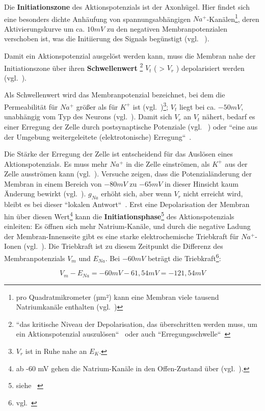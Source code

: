 {Die \textbf{Initiationszone} des Aktionspotenzials ist der Axonhügel. Hier findet sich eine besonders dichte Anhäufung von spannungsabhängigen $Na^+$-Kanälen\footnote{
 pro Quadratmikrometer (µm²) kann eine Membran viele tausend Natriumkanäle enthalten (vgl.~\cite[99]{BCP18})
}, deren Aktivierungskurve um ca. $10 mV$ zu den negativen Membranpotenzialen verschoben ist, was die Initiierung des Signals begünstigt (vgl. ~\cite[77]{Jon19}).

Damit ein Aktionspotenzial ausgelöst werden kann, muss die Membran nahe der Initiationszone über ihren \textbf{Schwellenwert} \footnote{
 ``das kritische Niveau der Depolarisation, das überschritten werden muss, um ein Aktionspotenzial auszulösen``~\cite[88]{BCP18} oder auch ``Erregungsschwelle``~\cite[69]{FE19}
} $V_t$ ( > $V_r$ ) depolarisiert werden (vgl.~\cite[111]{BCP18}).


 Als Schwellenwert wird das Membranpotenzial bezeichnet, bei dem die Permeabilität für $Na^+$ größer als für $K^+$ ist (vgl.~\cite[103]{BCP18})\footnote{$V_r$ ist in Ruhe nahe an $E_K$.}; $V_t$ liegt bei ca. $- 50mV$, unabhängig vom Typ des Neurons (vgl.~\cite[75]{Jon19}).
 Damit sich $V_r$ an $V_t$ nähert, bedarf es einer Erregung der Zelle durch postsynaptische Potenziale (vgl. ~\cite[69]{FE19}) oder ``eine aus der Umgebung weitergeleitete (elektrotonische) Erregung``~\cite[46]{SD07}.

Die Stärke der Erregung der Zelle ist entscheidend für das Auslösen eines Aktionspotenzials. Es muss mehr $Na^+$ in die Zelle einströmen, als $K^+$ aus der Zelle ausströmen kann (vgl.~\cite[69]{FE19}).
Versuche zeigen, dass die Potenzialänderung der Membran in einem Bereich von $-80 mV$ zu $-65 mV$ in dieser Hinsicht kaum Änderung bewirkt (vgl.~\cite[99]{BCP18}). $g_{Na}$ erhöht sich, aber wenn $V_r$ nicht erreicht wird, bleibt es bei dieser ``lokalen Antwort``~\cite[46]{SD07}. Erst eine Depolarisation der Membran hin über diesen Wert\footnote{
 ab -60 mV gehen die Natrium-Kanäle in den Offen-Zustand über (vgl.~\cite[69]{FE19}).
} kann die \textbf{Initiationsphase}\footnote{siehe ~\cite[68]{FE19}} des Aktionspotenzials einleiten: Es öffnen sich mehr Natrium-Kanäle, und durch die negative Ladung der Membran-Innenseite gibt es eine starke elektrochemische Triebkraft für $Na^+$-Ionen (vgl.~\cite[103]{BCP18}). Die Triebkraft ist zu diesem Zeitpunkt die Differenz des Membranpotenzials $V_m$ und $E_{Na}$. Bei $-60 mV$ beträgt die Triebkraft\footnote{
 vgl.~\cite[39]{Fak19}
}:

 \begin{equation}
  V_m - E_{Na} = -60 mV - 61,54 mV = -121,54 mV
  \label{eq:gl-triebkraft}
 \end{equation}


}
